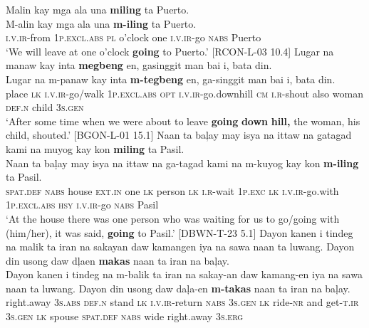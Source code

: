\ea
\label{bkm:Ref474396926}
Malin  kay  mga  ala  una  \textbf{miling}  ta  Puerto. \smallskip\\
\gll M-alin  kay  mga  ala  una  \textbf{m-iling}  ta  Puerto. \\
\textsc{i.v.ir}-from  1\textsc{p.excl.abs}  \textsc{pl}  o’clock  one  \textsc{i.v.ir}-go  \textsc{nabs}  Puerto \\
\glt ‘We will leave at one o’clock \textbf{going} to Puerto.’ [RCON-L-03 10.4]
\z
\ea
Lugar  na  manaw  kay  inta  \textbf{megbeng}  en, gasinggit  man  bai  i,  bata  din. \smallskip\\
\gll Lugar  na  m-panaw  kay  inta  \textbf{m-tegbeng}  en, ga-singgit  man  bai  i,  bata  din. \\
place  \textsc{lk}  \textsc{i.v.ir}-go/walk  1\textsc{p.excl.abs}  \textsc{opt}  \textsc{i.v.ir}-go.downhill  \textsc{cm}
\textsc{i.r}-shout  also  woman  \textsc{def.n}  child  3\textsc{s.gen} \\
\glt `After some time when we were about to leave \textbf{going} \textbf{down} \textbf{hill,} the woman, his child, shouted.’ [BGON-L-01 15.1]
\z
\ea
Naan  ta  baļay  may  isya  na  ittaw  na  gatagad  kami na  muyog  kay  kon  \textbf{miling}  ta  Pasil. \smallskip\\
\gll Naan  ta  baļay  may  isya  na  ittaw  na  ga-tagad  kami na  m-kuyog  kay  kon  \textbf{m-iling}  ta  Pasil. \\
\textsc{spat.def}  \textsc{nabs}  house  \textsc{ext.in}  one  \textsc{lk}  person  \textsc{lk}  \textsc{i.r}-wait  1\textsc{p.exc}
\textsc{lk}  \textsc{i.v.ir}-go.with  1\textsc{p.excl.abs}  \textsc{hsy}  \textsc{i.v.ir}-go  \textsc{nabs}  Pasil \\
\glt `At the house there was one person who was waiting for us to go/going with (him/her), it was said, \textbf{going} to Pasil.’ [DBWN-T-23 5.1]
\z
\ea
Dayon  kanen  i  tindeg  na  malik  ta  iran  na  sakayan daw  kamangen  iya  na  sawa  naan  ta  luwang.  Dayon  din usong  daw  dļaen  \textbf{makas}  naan  ta iran	na	baļay. \smallskip\\
\gll Dayon  kanen  i  tindeg  na  m-balik  ta  iran  na  sakay-an daw  kamang-en  iya  na  sawa  naan  ta  luwang.  Dayon  din usong  daw  daļa-en  \textbf{m-takas}  naan  ta iran	na	baļay. \\
right.away  3\textsc{s.abs}  \textsc{def.n}  stand  \textsc{lk}  \textsc{i.v.ir}-return  \textsc{nabs}  3\textsc{s.gen}  \textsc{lk}  ride-\textsc{nr}
and  get-\textsc{t.ir}  3\textsc{s.gen}  \textsc{lk}  spouse  \textsc{spat.def}  \textsc{nabs}  wide  right.away  3\textsc{s.erg}
